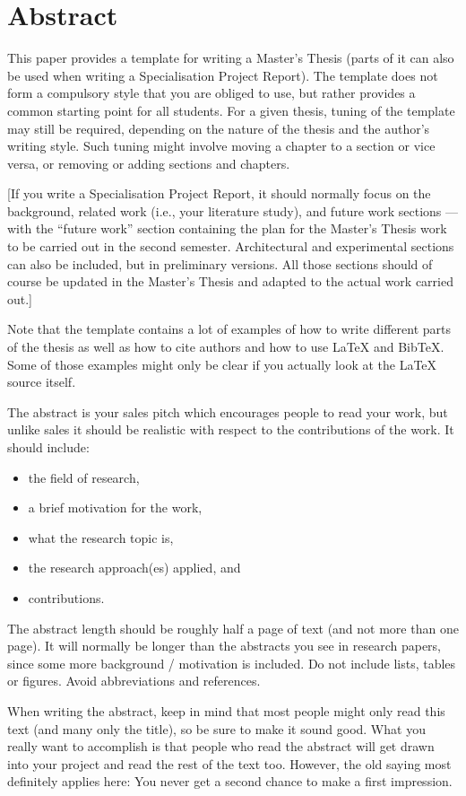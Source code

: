 \section*{Abstract}
This paper provides a template for writing a Master's Thesis 
(parts of it can also be used when writing a Specialisation Project Report). 
The template does not form a compulsory style that you are obliged to use, but rather provides a common starting point for all students. For a given thesis, tuning of the template may still be required, depending on the nature of the thesis and the author's writing style. 
Such tuning might involve moving a chapter to a section or vice versa, or removing or adding sections and chapters.

[If you write a Specialisation Project Report, it should normally focus on the background, related work (i.e., your literature study), and future work sections --- 
with the ``future work'' section containing the plan for the Master's Thesis work to be carried out in the second semester. 
Architectural and experimental sections can also be included, but in preliminary versions. 
All those sections should of course be updated in the Master's Thesis and adapted to the actual work carried out.]

Note that the template contains a lot of examples of how to write different parts of the thesis 
as well as how to cite authors and how to use LaTeX and BibTeX. 
Some of those examples might only be clear if you actually look at the LaTeX source itself.

The abstract is your sales pitch which encourages people to read your work, 
but unlike sales it should be realistic with respect to the contributions of the work. 
It should include:
\begin{itemize}
\item the field of research,
\item a brief motivation for the work,
\item what the research topic is, 
\item the research approach(es) applied, and 
\item contributions.
\end{itemize}

The abstract length should be roughly half a page of text (and not more than one page). 
It will normally be longer than the abstracts you see in research papers, since some more background / motivation is included.
Do not include lists, tables or figures.
Avoid abbreviations and references. 

When writing the abstract, keep in mind that most people might only read this text (and many only the title), so be sure to make it sound good.
What you really want to accomplish is that people who read the abstract will get drawn into your project and read the rest of the text too.
However, the old saying most definitely applies here: You never get a second chance to make a first impression. 